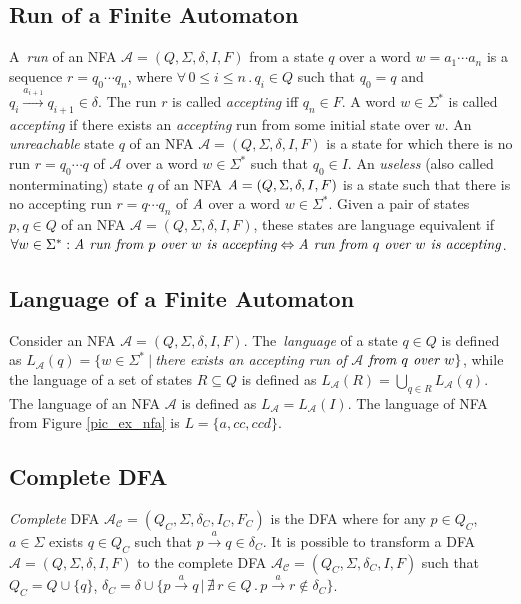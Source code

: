 	\subsection{Run of a Finite Automaton}
	\label{defRun}
  A~\emph{run} of an NFA $\mathcal{A}=(Q,\Sigma,\delta,I,F)$ from a state $q$
  over a word $w=a_1\cdots a_n$ is a sequence $r = q_0 \cdots q_n$, where $\forall\,0\leq i \leq n\,.\,q_i\in Q$ 
  such that $q_0=q$ and $q_i\xrightarrow{a_{i+1}}q_{i+1}\in \delta$. 
  The run $r$ is called \emph{accepting} iff $q_n \in F$. 
	A word $w \in \Sigma^{*}$ is called \emph{accepting} if there exists an \emph{accepting} run from some initial state over $w$.
  An \emph{unreachable} state $q$ of an NFA $\mathcal{A}=(Q,\Sigma,\delta,I,F)$ is a state for which there is no run $r=q_0\cdots q$ of 
  $\mathcal{A}$ over a word $w \in \Sigma^{*}$ such that $q_0\in I$.
  An \emph{useless} (also called nonterminating) state $q$ of an NFA $\emph{A}=(Q,\Sigma,\delta,I,F)$ is a state such 
  that there is no accepting run $r=q\cdots q_n$ 
  of $\emph{A}$ over a word $w \in \Sigma^{*}$.
  Given a pair of states $p,q\in Q$ of an NFA $\mathcal{A}=(Q,\Sigma,\delta,I,F)$, these states are language equivalent if 
  $\forall w \in \Sigma^{*}: \emph{A run from } p \emph{ over } w \emph{ is accepting} \Leftrightarrow 
			\emph{A run from } q \emph{ over } w \emph{ is accepting}$.


  \subsection{Language of a Finite Automaton}
  Consider an NFA $\mathcal{A}=(Q,\Sigma,\delta,I,F)$.
  The~\emph{language} of a state $q \in Q$ is defined as 
  $L_\mathcal{A}(q) = \{w\in \Sigma^{*}\ |\ $\emph{there exists an accepting run of }$
  \mathcal{A}$$ 
  \emph{ from }q\emph{ over }w\}$, while the language of a set of states $R\subseteq Q$ is defined as $L_{\mathcal{A}}(R)=\bigcup_{q\in R}L_{\mathcal{A}}(q)$.
  The language of an NFA $\mathcal{A}$ is defined as $L_{\mathcal{A}}=L_{\mathcal{A}}(I)$.
  The language of NFA from Figure \ref{pic_ex_nfa} is $L=\{a,cc,ccd\}$.

  \subsection{Complete DFA}
  \label{defCompleteDFA}
  \emph{Complete} DFA $\mathcal{A_C}=(Q_C,\Sigma,\delta_C,I_C,F_C)$ is the DFA where 
  for any $p\in Q_C$, $a\in \Sigma$ exists $q\in Q_C$ such that  $p\xrightarrow{a}q\in\delta_C$. 
  It is possible to transform a DFA $\mathcal{A}=(Q,\Sigma,\delta,I,F)$ to the complete DFA $\mathcal{A_C}=(Q_C,\Sigma,\delta_C,I,F)$ such that $Q_C=Q\cup\{q\}$, 
  $\delta_C = \delta \cup \{p\xrightarrow{a}q\,|\,\nexists\, r \in Q\,.\,p\xrightarrow{a}r\not\in\delta_C\}$.

